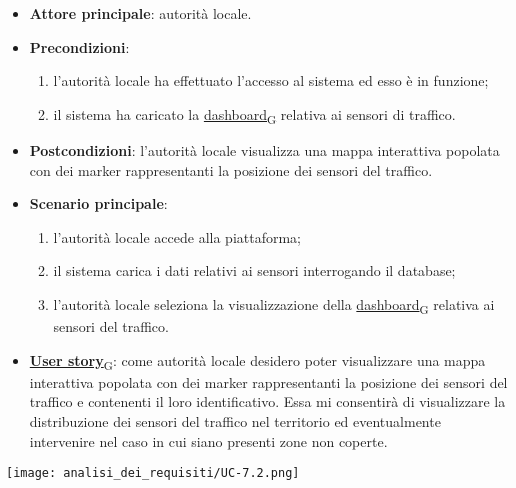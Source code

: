 \newpage

\begin{itemize}
	\item \textbf{Attore principale}: autorità locale.
	\item \textbf{Precondizioni}:
	      \begin{enumerate}
		      \item l'autorità locale ha effettuato l'accesso al sistema ed esso è in funzione;
		      \item il sistema ha caricato la \href{https://7last.github.io/docs/rtb/documentazione-interna/glossario\#dashboard}{dashboard\textsubscript{G}} relativa ai sensori di traffico.
	      \end{enumerate}
	\item \textbf{Postcondizioni}: l'autorità locale visualizza una mappa interattiva popolata con dei marker rappresentanti la posizione dei sensori del traffico.
	\item \textbf{Scenario principale}:
	      \begin{enumerate}
		      \item l'autorità locale accede alla piattaforma;
		      \item il sistema carica i dati relativi ai sensori interrogando il database;
		      \item l'autorità locale seleziona la visualizzazione della \href{https://7last.github.io/docs/rtb/documentazione-interna/glossario\#dashboard}{dashboard\textsubscript{G}} relativa ai sensori del traffico.
	      \end{enumerate}
	\item \href{https://7last.github.io/docs/rtb/documentazione-interna/glossario\#user-story}{\textbf{User story}\textsubscript{G}}:
	      come autorità locale desidero poter visualizzare una mappa interattiva popolata con dei marker rappresentanti la posizione dei sensori del traffico
	      e contenenti il loro identificativo. Essa mi consentirà di visualizzare la distribuzione dei sensori del traffico nel territorio ed eventualmente intervenire nel caso in cui siano presenti zone non coperte.
\end{itemize}
\begin{center}
	\texttt{[image: analisi\_dei\_requisiti/UC-7.2.png]}
\end{center}

\newpage


